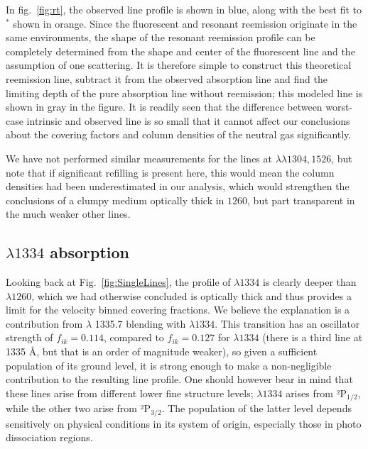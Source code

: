 \documentclass[twocolumn, trackchanges]{aastex61}
\begin{document}
In fig.~\ref{fig:rt}, the observed line profile is shown in blue, along
with the best fit to $^*$ shown in orange. Since the
fluorescent and resonant reemission originate in the same environments,
the shape of the resonant reemission profile can be completely
determined from the shape and center of the fluorescent line and the
assumption of one scattering. It is therefore simple to construct this
theoretical reemission line, subtract it from the observed absorption
line and find the limiting depth of the pure absorption line without
reemission; this modeled line is shown in gray in the figure. It is
readily seen that the difference between worst-case intrinsic and
observed line is so small that it cannot affect our conclusions about
the covering factors and column densities of the neutral gas
significantly.

We have not performed similar measurements for the lines at
$\lambda \lambda 1304, 1526$, but note that if significant refilling is
present here, this would mean the column densities had been
underestimated in our analysis, which would strengthen the conclusions
of a clumpy medium optically thick in  $1260$, but part
transparent in the much weaker other lines.

\subsection{ $\lambda 1334$
absorption}\label{lambda-1334-absorption}

Looking back at Fig.~\ref{fig:SingleLines}, the profile of 
$\lambda 1334$ is clearly deeper than  $\lambda 1260$, which
we had otherwise concluded is optically thick and thus provides a limit
for the velocity binned covering fractions. We believe the explanation
is a contribution from  $\lambda$ 1335.7 blending with
$\lambda 1334$. This transition has an oscillator strength of
$f_{ik} = 0.114$, compared to $f_{ik} = 0.127$ for $\lambda 1334$ (there
is a third line at 1335 Å, but that is an order of magnitude weaker), so
given a sufficient population of its ground level, it is strong enough
to make a non-negligible contribution to the resulting line profile. One
should however bear in mind that these lines arise from different lower
fine structure levels; $\lambda 1334$ arises from ²P$_{1/2}$, while the
other two arise from ²P$_{3/2}$. The population of the latter level
depends sensitively on physical conditions in its system of origin,
especially those in photo dissociation regions.
\end{document}
